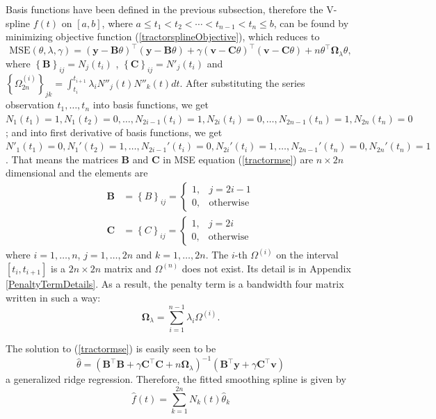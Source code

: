 Basis functions have been defined in the previous subsection, therefore the V-spline $f(t)$ on $[a,b]$, where $a \leq t_1 < t_2< \cdots < t_{n-1}<t_n \leq b$, can be found by minimizing  objective function (\ref{tractorsplineObjective}), which reduces to
\begin{equation}\label{tractormse}
\text{MSE}(\theta, \lambda,\gamma) = \left(\mathbf{y}-\mathbf{B}\theta\right)^\top \left(\mathbf{y}-\mathbf{B}\theta\right) +\gamma \left(\mathbf{v}-\mathbf{C}\theta\right)^\top \left(\mathbf{v}-\mathbf{C}\theta\right)+n \theta^\top\mathbf{\Omega}_{\lambda}\theta,
\end{equation}
where $\left\lbrace \mathbf{B}\right\rbrace_{ij} = N_j(t_i)$ , $\left\lbrace \mathbf{C}\right\rbrace_{ij} = N'_j(t_i)$ and $\left\lbrace \Omega_{2n}^{(i)} \right\rbrace_{jk}=\int_{t_i}^{t_{i+1}}\lambda_i N''_j(t)N''_k(t)dt$. After substituting the series observation $t_1, \ldots, t_n$ into basis functions, we get $N_1(t_1)=1, N_1(t_2)=0, \ldots, N_{2i-1}(t_{i})=1, N_{2i}(t_{i})=0, \ldots, N_{2n-1}(t_n)=1, N_{2n}(t_n)=0$; and into first derivative of basis functions, we get $N'_1(t_1)=0, N_1'(t_2)=1, \ldots, N_{2i-1}'(t_{i})=0, N_{2i}'(t_{i})=1, \ldots, N_{2n-1}'(t_n)=0, N_{2n}'(t_n)=1$. That means the matrices $\mathbf{B}$ and $\mathbf{C}$ in MSE equation (\ref{tractormse}) are $n \times 2n$ dimensional and the elements are
\begin{align}
\mathbf{B}&=\left\lbrace B\right\rbrace_{ij}=\begin{cases}
1, & j=2i-1\\
0, & \mbox{otherwise}
\end{cases}\\
\mathbf{C}&=\left\lbrace C\right\rbrace_{ij}=\begin{cases}
1, & j=2i\\
0, & \mbox{otherwise}
\end{cases}
\end{align}
where $i=1, \ldots, n$, $j=1,\ldots,2n$ and $k=1,\ldots,2n$. The $i$-th $\Omega^{(i)}$ on the interval $[t_i,t_{i+1}]$ is a $2n \times 2n$ matrix and $\Omega^{(n)}$ does not exist. Its detail is in Appendix \ref{PenaltyTermDetails}. As a result, the penalty term is a bandwidth four matrix written in such a way:
\begin{equation}
\mathbf{\Omega}_\lambda=\sum_{i=1}^{n-1}\lambda_i\Omega^{(i)}.
\end{equation}



The solution to (\ref{tractormse}) is easily seen to be
\begin{equation}\label{thetahat}
\hat{\theta}=\left(\mathbf{B}^\top\mathbf{B}+\gamma\mathbf{C}^\top\mathbf{C}+n\mathbf{\Omega}_{\lambda}\right)^{-1}\left(\mathbf{B}^\top\mathbf{y}+\gamma\mathbf{C}^\top\mathbf{v}\right)
\end{equation}
a generalized ridge regression. Therefore, the fitted smoothing spline is given by
\begin{equation}
\hat{f}(t)=\sum_{k=1}^{2n}N_k(t)\hat{\theta}_k
\end{equation}


